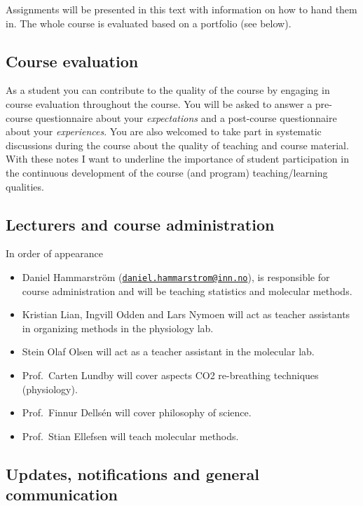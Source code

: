 \documentclass[
  11pt,
]{krantz}
\providecommand{\tightlist}{%
  \setlength{\itemsep}{0pt}\setlength{\parskip}{0pt}}
\begin{document}
Assignments will be presented in this text with information on how to hand them in. The whole course is evaluated based on a portfolio (see below).

\hypertarget{course-evaluation}{%
\subsection{Course evaluation}\label{course-evaluation}}

As a student you can contribute to the quality of the course by engaging in course evaluation throughout the course. You will be asked to answer a pre-course questionnaire about your \emph{expectations} and a post-course questionnaire about your \emph{experiences}. You are also welcomed to take part in systematic discussions during the course about the quality of teaching and course material. With these notes I want to underline the importance of student participation in the continuous development of the course (and program) teaching/learning qualities.

\hypertarget{lecturers-and-course-administration}{%
\subsection{Lecturers and course administration}\label{lecturers-and-course-administration}}

In order of appearance

\begin{itemize}
\tightlist
\item
  Daniel Hammarström (\href{mailto:daniel.hammarstrom@inn.no}{\nolinkurl{daniel.hammarstrom@inn.no}}), is responsible for course administration and will be teaching statistics and molecular methods.
\item
  Kristian Lian, Ingvill Odden and Lars Nymoen will act as teacher assistants in organizing methods in the physiology lab.
\item
  Stein Olaf Olsen will act as a teacher assistant in the molecular lab.
\item
  Prof.~Carten Lundby will cover aspects CO2 re-breathing techniques (physiology).
\item
  Prof.~Finnur Dellsén will cover philosophy of science.
\item
  Prof.~Stian Ellefsen will teach molecular methods.
\end{itemize}

\hypertarget{updates-notifications-and-general-communication}{%
\subsection{Updates, notifications and general communication}\label{updates-notifications-and-general-communication}}
\end{document}

